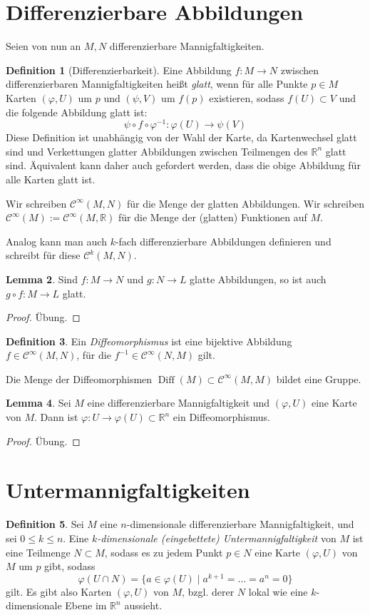 \documentclass[a4paper]{scrbook}
\numberwithin{equation}{chapter}
\DeclareMathOperator{\Diff}{Diff}
\newcommand{\R}{\mathbb{R}}
\newcommand{\sC}{\mathcal{C}^{\infty}}
\theoremstyle{definition}
\newtheorem{defn}{Definition}[section]
\newtheorem{lemma}[defn]{Lemma}
\newcommand{\bewUeb}{\begin{proof}Übung.\end{proof}}
\begin{document}
	\section{Differenzierbare Abbildungen}
		Seien von nun an $M,N$ differenzierbare Mannigfaltigkeiten.
		\begin{defn}[Differenzierbarkeit]
			Eine Abbildung $f\colon M\rightarrow N$ zwischen differenzierbaren Mannigfaltigkeiten heißt \emph{glatt}, wenn für alle Punkte $p\in M$ Karten $(\varphi,U)$ um  $p$ und $(\psi,V)$ um $f(p)$ existieren, sodass $f(U)\subset V$ und die folgende Abbildung glatt ist:
			\begin{equation}
				\psi\circ f \circ \varphi^{-1}\colon \varphi(U)\rightarrow \psi(V)
			\end{equation}
			Diese Definition ist unabhängig von der Wahl der Karte, da Kartenwechsel glatt sind und Verkettungen glatter Abbildungen zwischen Teilmengen des $\R^n$ glatt sind. Äquivalent kann daher auch gefordert werden, dass die obige Abbildung für alle Karten glatt ist.

			Wir schreiben $\sC(M,N)$ für die Menge der glatten Abbildungen. Wir schreiben $\sC(M) := \sC(M,\R)$ für die Menge der (glatten) Funktionen auf $M$.
			
			Analog kann man auch $k$-fach differenzierbare Abbildungen definieren und schreibt für diese $\mathcal{C}^k(M,N)$.
		\end{defn}
		\begin{lemma}
			Sind $f\colon M\to N$ und $g\colon N \to L$ glatte Abbildungen, so ist auch $g\circ f \colon M \to L$ glatt.
			\bewUeb
		\end{lemma}
		\begin{defn}
			Ein \emph{Diffeomorphismus} ist eine bijektive Abbildung $f\in\sC(M,N)$, für die $f^{-1}\in\sC(N,M)$ gilt.

			Die Menge der Diffeomorphismen $\Diff(M)\subset\sC(M,M)$ bildet eine Gruppe.
		\end{defn}
		\begin{lemma} \label{lemma:karte_diffeo}
			Sei $M$ eine differenzierbare Mannigfaltigkeit und $(\varphi,U)$ eine Karte von $M$. Dann ist $\varphi\colon U \to \varphi(U) \subset \R^n$ ein Diffeomorphismus.
			\bewUeb
		\end{lemma}

\section{Untermannigfaltigkeiten}
\begin{defn}
	Sei $M$ eine $n$-dimensionale differenzierbare Mannigfaltigkeit, und sei $0 \le k \le n$. Eine \emph{$k$-dimensionale (eingebettete) Untermannigfaltigkeit} von $M$ ist eine Teilmenge $N \subset M$, sodass es zu jedem Punkt $p \in N$ eine Karte $(\varphi,U)$ von $M$ um $p$ gibt, sodass
	\[\varphi(U\cap N) = \{a \in \varphi(U) \mid a^{k+1} = \dots = a^n = 0\}\]
	gilt. Es gibt also Karten $(\varphi,U)$ von $M$, bzgl. derer $N$ lokal wie eine $k$-dimensionale Ebene im $\R^n$ aussieht.
\end{defn}
\end{document}

